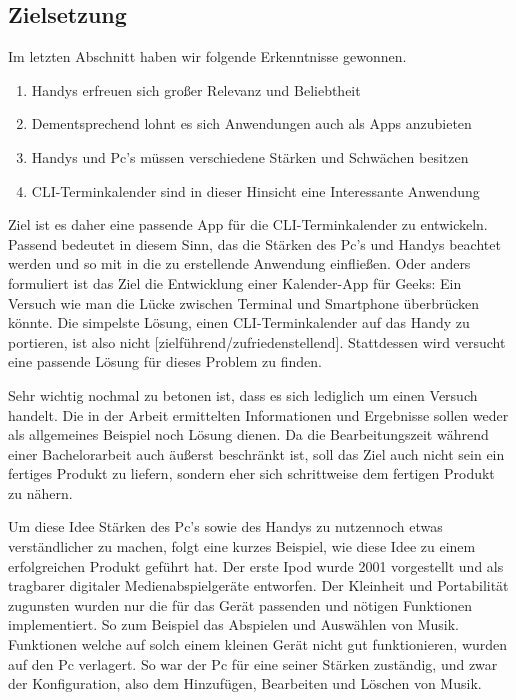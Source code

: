 \subsection{Zielsetzung}\label{section:zielsetzung} \myCheckmark

Im letzten Abschnitt haben wir folgende Erkenntnisse gewonnen.
\begin{enumerate}
	\item Handys erfreuen sich großer Relevanz und Beliebtheit
	\item Dementsprechend lohnt es sich Anwendungen auch als Apps anzubieten
	\item Handys und Pc's müssen verschiedene Stärken und Schwächen besitzen
	\item CLI-Terminkalender sind in dieser Hinsicht eine Interessante Anwendung
\end{enumerate}

\myNewSection
Ziel ist es daher eine passende App für die CLI-Terminkalender zu entwickeln. Passend bedeutet in diesem Sinn, das die Stärken des Pc's und Handys beachtet werden und so mit in die zu erstellende Anwendung einfließen.\newline%
Oder anders formuliert ist das Ziel die \glqq Entwicklung einer Kalender-App für Geeks: Ein Versuch wie man die Lücke zwischen Terminal und Smartphone überbrücken könnte\grqq{}.\newline%
Die simpelste Lösung, einen CLI-Terminkalender auf das Handy zu portieren, ist also nicht [zielführend/zufriedenstellend]. Stattdessen wird versucht eine passende Lösung für dieses Problem zu finden.%

\myNewSection
Sehr wichtig nochmal zu betonen ist, dass es sich lediglich um einen Versuch handelt. Die in der Arbeit ermittelten Informationen und Ergebnisse sollen weder als allgemeines Beispiel noch Lösung dienen.\newline%
Da die Bearbeitungszeit während einer Bachelorarbeit auch äußerst beschränkt ist, soll das Ziel auch nicht sein ein fertiges Produkt zu liefern, sondern eher sich schrittweise dem fertigen Produkt zu nähern.


\myNewSection
Um diese Idee \dq Stärken des Pc's sowie des Handys zu nutzen\dq noch etwas verständlicher zu machen, folgt eine kurzes Beispiel, wie diese Idee zu einem erfolgreichen Produkt geführt hat.
Der erste Ipod\cite{einleitung_ipod} wurde 2001 vorgestellt und als \glqq tragbarer digitaler Medienabspielgeräte\grqq{} entworfen. Der Kleinheit und Portabilität zugunsten wurden nur die für das Gerät passenden und nötigen Funktionen implementiert. So zum Beispiel das Abspielen und Auswählen von Musik. Funktionen welche auf solch einem kleinen Gerät nicht gut funktionieren, wurden auf den Pc verlagert. So war der Pc für eine seiner Stärken zuständig, und zwar der Konfiguration, also dem Hinzufügen, Bearbeiten und Löschen von Musik. 

